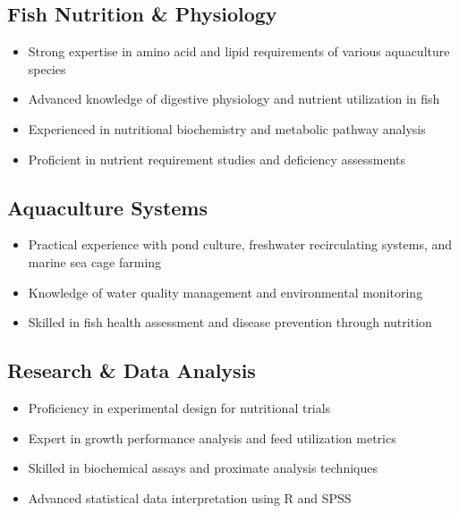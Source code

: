 \documentclass[11pt,a4paper]{article}
\begin{document}
\subsection{Fish Nutrition \& Physiology}
\begin{itemize}[leftmargin=*,noitemsep]
    \item Strong expertise in amino acid and lipid requirements of various aquaculture species
    \item Advanced knowledge of digestive physiology and nutrient utilization in fish
    \item Experienced in nutritional biochemistry and metabolic pathway analysis
    \item Proficient in nutrient requirement studies and deficiency assessments
\end{itemize}

\subsection{Aquaculture Systems}
\begin{itemize}[leftmargin=*,noitemsep]
    \item Practical experience with pond culture, freshwater recirculating systems, and marine sea cage farming
    \item Knowledge of water quality management and environmental monitoring
    \item Skilled in fish health assessment and disease prevention through nutrition
\end{itemize}

\subsection{Research \& Data Analysis}
\begin{itemize}[leftmargin=*,noitemsep]
    \item Proficiency in experimental design for nutritional trials
    \item Expert in growth performance analysis and feed utilization metrics
    \item Skilled in biochemical assays and proximate analysis techniques
    \item Advanced statistical data interpretation using R and SPSS
\end{itemize}
\end{document}
